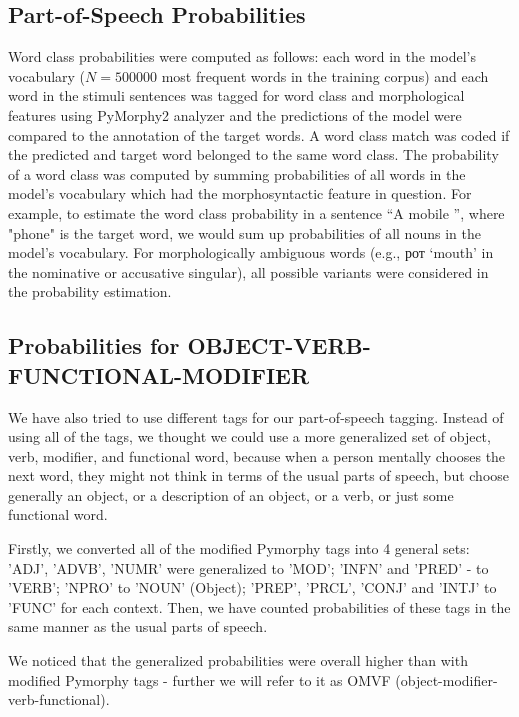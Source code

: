 \documentclass[a4paper]{article}
\begin{document}
\subsection{Part-of-Speech Probabilities}

Word class probabilities were computed as follows: each word in the model’s vocabulary (\(N = 500000\) most frequent words in the training corpus) and each word in the stimuli sentences was tagged for word class and morphological features using PyMorphy2 analyzer 
\cite{korobov:2015} and the predictions of the model were compared to the annotation of the target words. A word class match was coded if the predicted and target word belonged to the same word class. The probability of a word class was computed by summing probabilities of all words in the model’s vocabulary which had the morphosyntactic feature in question. For example, to estimate the word class probability in a sentence “A mobile \underline{\hspace{1em}}”, where "phone" is the target word, we would sum up probabilities of all nouns in the model’s vocabulary. For morphologically ambiguous words (e.g., рот ‘mouth’ in the nominative or accusative singular), all possible variants were considered in the probability estimation.

\subsection{Probabilities for OBJECT-VERB-FUNCTIONAL-MODIFIER}

We have also tried to use different tags for our part-of-speech tagging. Instead of using all of the tags, we thought we could use a more generalized set of object, verb, modifier, and functional word, because when a person mentally chooses the next word, they might not think in terms of the usual parts of speech, but choose generally an object, or a description of an object, or a verb, or just some functional word.

Firstly, we converted all of the modified Pymorphy tags into 4 general sets: 'ADJ', 'ADVB', 'NUMR' were generalized to 'MOD'; 'INFN' and 'PRED' - to 'VERB'; 'NPRO' to 'NOUN' (Object); 'PREP', 'PRCL', 'CONJ' and 'INTJ' to 'FUNC' for each context. Then, we have counted probabilities of these tags in the same manner as the usual parts of speech. 

We noticed that the generalized probabilities were overall higher than with modified Pymorphy tags - further we will refer to it as OMVF (object-modifier-verb-functional).
\end{document}
